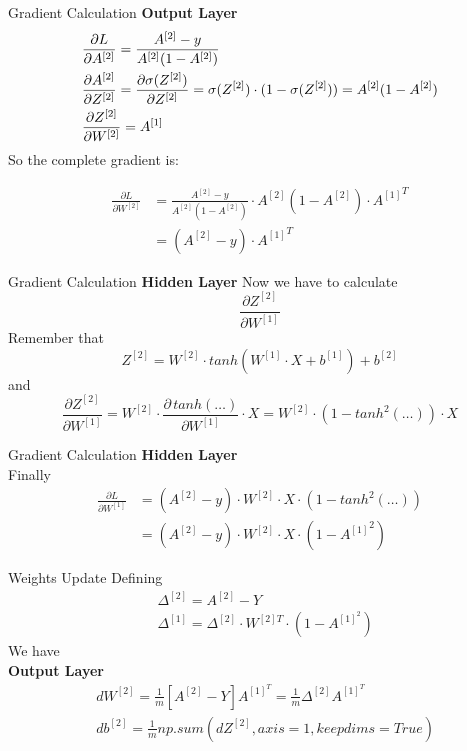 \documentclass[11pt]{beamer}
\begin{document}
\begin{frame}{Gradient Calculation}
\textbf{Output Layer}
\begin{align*}
& \frac{\partial L}{\partial A^{[2]}} = \frac{A^{[2]} - y}{A^{[2]}(1 - A^{[2]})} \notag\\
& \frac{\partial A^{[2]}}{\partial Z^{[2]}} = \frac{\partial \sigma(Z^{[2]})}{\partial Z^{[2]}} = \sigma(Z^{[2]}) \cdot (1 - \sigma(Z^{[2]})) 
= A^{[2]} (1 - A^{[2]}) \\
& \frac{\partial Z^{[2]}}{\partial W^{[2]}} = A^{[1]} 
\end{align*}
So the complete gradient is:

\begin{align*}
\frac{\partial L}{\partial W^{[2]}} &=  
\frac{A^{[2]} - y}{A^{[2]}(1 - A^{[2]})} \cdot 
A^{[2]} (1 - A^{[2]}) \cdot {A^{[1]}}^T \\
&= (A^{[2]} - y) \cdot {A^{[1]}}^T
\end{align*}

\end{frame}
\begin{frame}{Gradient Calculation}
\textbf{Hidden Layer}
Now we have to calculate
$$\frac{\partial Z^{[2]}}{\partial W^{[1]}}$$
Remember that
$$Z^{[2]} = W^{[2]} \cdot tanh\left( W^{[1]} \cdot X + b^{[1]} \right) + b^{[2]}$$
and
$$\frac{\partial Z^{[2]}}{\partial W^{[1]}} = W^{[2]} \cdot \frac{\partial \, tanh(\dots)}{\partial W^{[1]}} \cdot X = W^{[2]} \cdot \left( 1 - tanh^2(\dots) \right) \cdot X$$
\end{frame}
\begin{frame}{Gradient Calculation}
\textbf{Hidden Layer}\\
\vspace{0.5cm}
Finally
\begin{align*}
\frac{\partial L}{\partial W^{[1]}} &= (A^{[2]} - y) \cdot W^{[2]} \cdot X \cdot \left( 1 - tanh^2(\dots) \right) \\
&= (A^{[2]} - y) \cdot W^{[2]} \cdot X \cdot \left( 1 - {A^{[1]}}^2 \right)
\end{align*}
\end{frame}
\begin{frame}{Weights Update}
Defining
\begin{align} 
& \Delta^{[2]} = A^{[2]} - Y  \\
& \Delta^{[1]} = \Delta^{[2]} \cdot W^{[2]T} \cdot (1 - A^{[1]^2})
\end{align}
We have\\
\vspace{0.5cm} 
\textbf{Output Layer}
\begin{align}
& dW^{[2]} = \frac{1}{m}\left[A^{[2]} - Y \right]A^{[1]^T} = \frac{1}{m}\Delta^{[2]}A^{[1]^T} \\
& db^{[2]} = \frac{1}{m}np.sum(dZ^{[2]}, axis=1, keepdims=True) 
\end{align}
\end{frame}
\end{document}
